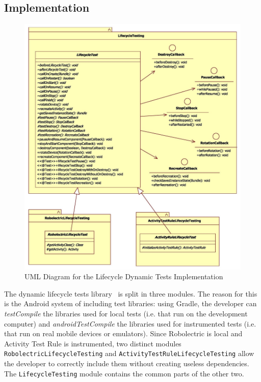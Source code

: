 \documentclass[11pt,a4paper,notitlepage]{article}
\begin{document}
\subsection{Implementation}
\begin{figure}
  \centering
  \includegraphics[width=\textwidth]{Images/LifecycleDyn/UML/Implementation.jpg}
  \caption[Lifecycle Tests Implementation UML]{UML Diagram for the Lifecycle Dynamic Tests Implementation}
\end{figure}
The dynamic lifecycle tests library~\cite{DynamicLifecycleTesting} is split in three modules. The reason for this is the Android system of including test libraries: using Gradle, the developer can \textit{testCompile} the libraries used for local tests (i.e. that run on the development computer) and \textit{androidTestCompile} the libraries used for instrumented tests (i.e. that run on real mobile devices or emulators). Since Robolectric is local and Activity Test Rule is instrumented, two distinct modules \texttt{RobolectricLifecycleTesting} and \texttt{ActivityTestRuleLifecycleTesting} allow the developer to correctly include them without creating useless dependencies. The \texttt{LifecycleTesting} module contains the common parts of the other two.
\end{document}
